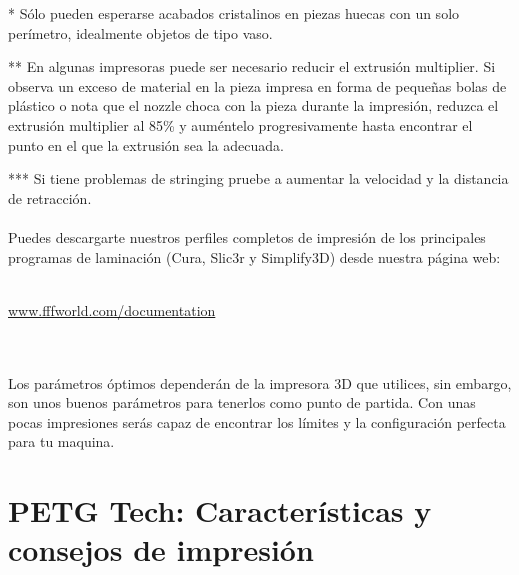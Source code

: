 \documentclass[11pt,a4paper]{article}
\begin{document}
* Sólo pueden esperarse acabados cristalinos en piezas huecas con un solo perímetro, idealmente objetos de tipo vaso.

** En algunas impresoras puede ser necesario reducir el extrusión multiplier. Si observa un exceso de material en la pieza impresa en forma de pequeñas bolas de plástico o nota que el nozzle choca con la pieza durante la impresión, reduzca el extrusión multiplier al 85\% y auméntelo progresivamente hasta encontrar el punto en el que la extrusión sea la adecuada.

*** Si tiene problemas de stringing pruebe a aumentar la velocidad y la distancia de retracción.
\\\\
Puedes descargarte nuestros perfiles completos de impresión de los principales programas de laminación (Cura, Slic3r y Simplify3D) desde nuestra página web:
\\\\
\centerline{ {\huge \url{www.fffworld.com/documentation} } }
\\\\
Los parámetros óptimos dependerán de la impresora 3D que utilices, sin embargo, son unos buenos parámetros para tenerlos como punto de partida. Con unas pocas impresiones serás capaz de encontrar los límites y la configuración perfecta para tu maquina.
\section{PETG Tech: Características y consejos de impresión}
\end{document}
